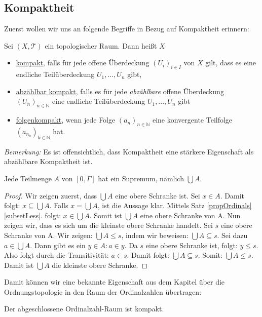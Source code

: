 \documentclass[11pt]{scrartcl}
\begin{document}
\subsection{Kompaktheit}
Zuerst wollen wir uns an folgende Begriffe in Bezug auf Kompaktheit erinnern:
\begin{definition}
	Sei $(X,\mathcal T)$ ein topologischer Raum. Dann heißt $X$
	\begin{itemize}
		\item \underline{kompakt}, falls für jede offene Überdeckung $(U_i)_{i\in I}$ von $X$
			gilt, dass es eine endliche Teilüberdeckung $U_1,...,U_n$ gibt,
		\item \underline{abzählbar kompakt}, falls es für jede \textit{abzählbare} offene 
			Überdeckung $(U_n)_{n\in\mathbb N}$ eine endliche Teilüberdeckung $U_1,...,U_n$
			gibt
		\item \underline{folgenkompakt}, wenn jede Folge $(a_n)_{n\in\mathbb N}$ eine konvergente
			Teilfolge $(a_{n_k})_{k\in\mathbb N}$ hat.
	\end{itemize}
\end{definition}
\noindent \textit{Bemerkung:} Es ist offensichtlich, dass Kompaktheit eine stärkere Eigenschaft als abzählbare Kompaktheit ist.
\begin{lemma}\label{supOfOrdinals}
	Jede Teilmenge $A$ von $[0,\Gamma]$ hat ein Supremum, nämlich $\bigcup A$.
\end{lemma}
\begin{proof}
	Wir zeigen zuerst, dass $\bigcup A$ eine obere Schranke ist.
	Sei $x\in A$. Damit folgt: $ x \subseteq \bigcup A$. Falls $x=\bigcup A$, ist die Aussage klar. Mittels Satz \ref{propOrdinals} \ref{subsetLess}. folgt: $x\in \bigcup A$. Somit ist $\bigcup A$ eine obere Schranke von A.
	Nun zeigen wir, dass es sich um die kleinste obere Schranke handelt. Sei $s$ eine obere Schranke von A.
	Wir zeigen: $\bigcup A\leq s$, indem wir beweisen: $\bigcup A \subseteq s$. Sei dazu $a\in \bigcup A$. 
	Dann gibt es ein $y\in A: a\in y$. Da $s$ eine obere Schranke ist, folgt: $y \leq s$. Also folgt durch
	die Transitivität: $a\in s$. Damit folgt: $\bigcup A \subseteq s$. Somit: $\bigcup A \leq s$.
	Damit ist $\bigcup A$ die kleinste obere Schranke.
\end{proof}
Damit können wir eine bekannte Eigenschaft aus dem Kapitel über die Ordnungstopologie in den Raum der Ordinalzahlen übertragen:
\begin{theorem}
	Der abgeschlossene Ordinalzahl-Raum ist kompakt.
\end{theorem}
\end{document}
